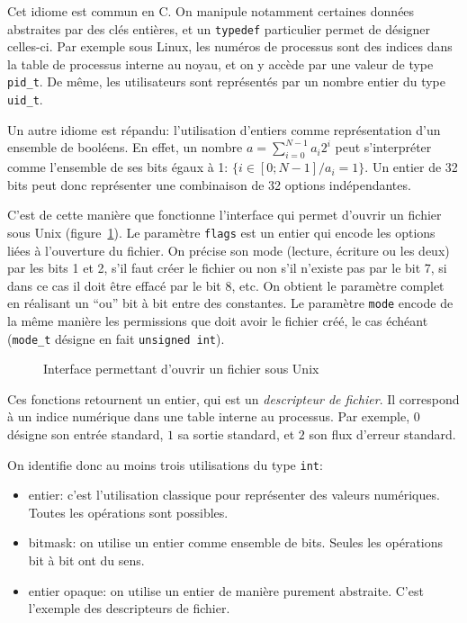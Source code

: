 Cet idiome est commun en C. On manipule notamment certaines données abstraites
par des clés entières, et un \texttt{typedef} particulier permet de désigner
celles-ci. Par exemple sous Linux, les numéros de processus sont des indices
dans la table de processus interne au noyau, et on y accède par une valeur de
type \texttt{pid\_t}. De même, les utilisateurs sont représentés par un nombre
entier du type \texttt{uid\_t}.

Un autre idiome est répandu: l'utilisation d'entiers comme représentation d'un
ensemble de booléens. En effet, un nombre $a = \sum_{i=0}^{N-1} a_i 2^i$ peut
s'interpréter comme l'ensemble de ses bits égaux à 1: $\{ i ∈ [0;N-1] / a_i = 1
\}$. Un entier de 32 bits peut donc représenter une combinaison de 32 options
indépendantes.

C'est de cette manière que fonctionne l'interface qui permet d'ouvrir un fichier
sous Unix (figure~\ref{fig:unix-open}). Le paramètre \texttt{flags} est un
entier qui encode les options liées à l'ouverture du fichier. On précise son
mode (lecture, écriture ou les deux) par les bits 1 et 2, s'il faut créer le
fichier ou non s'il n'existe pas par le bit 7, si dans ce cas il doit être
effacé par le bit 8, etc. On obtient le paramètre complet en réalisant un
\enquote{ou} bit à bit entre des constantes. Le paramètre \texttt{mode} encode
de la même manière les permissions que doit avoir le fichier créé, le cas
échéant (\texttt{mode\_t} désigne en fait \texttt{unsigned int}).

\begin{figure}[h]
    \caption{Interface permettant d'ouvrir un fichier sous Unix}
    \label{fig:unix-open}
\end{figure}


Ces fonctions retournent un entier, qui est un \emph{descripteur de fichier}. Il
correspond à un indice numérique dans une table interne au processus. Par
exemple, $0$ désigne son entrée standard, $1$ sa sortie standard, et $2$ son
flux d'erreur standard.

On identifie donc au moins trois utilisations du type \texttt{int}:

\begin{itemize}
    \item entier: c'est l'utilisation classique pour représenter des valeurs
        numériques. Toutes les opérations sont possibles.
    \item bitmask: on utilise un entier comme ensemble de bits. Seules les
        opérations bit à bit ont du sens.
    \item entier opaque: on utilise un entier de manière purement abstraite.
        C'est l'exemple des descripteurs de fichier.
\end{itemize}

